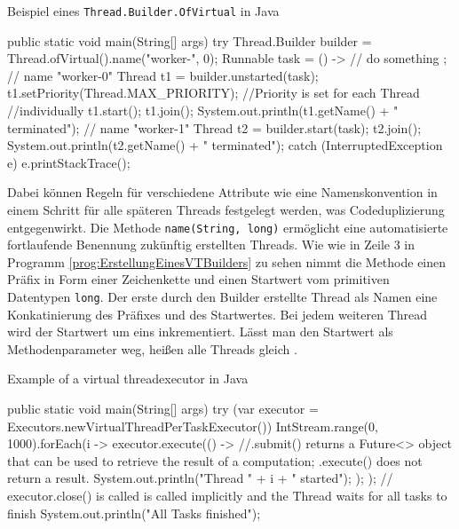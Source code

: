     
    \begin{program} [H]
        \caption{Beispiel eines \texttt{Thread.Builder.OfVirtual} in Java}
        \label{prog:ErstellungEinesVTBuilders}
    \begin{JavaCode}[language=Java, numbers=left]
public static void main(String[] args) {
    try {
        Thread.Builder builder = Thread.ofVirtual().name("worker-", 0);
        Runnable task = () -> {
            // do something
        };
        // name "worker-0"
        Thread t1 = builder.unstarted(task);
        t1.setPriority(Thread.MAX_PRIORITY);    //Priority is set for each Thread 
                                                //individually   
        t1.start(); t1.join();
        System.out.println(t1.getName() + " terminated");
        // name "worker-1"
        Thread t2 = builder.start(task);   
        t2.join();  
        System.out.println(t2.getName() + " terminated");
    } catch (InterruptedException e) {
        e.printStackTrace();
    }
}\end{JavaCode}
    \end{program}

    Dabei können Regeln für verschiedene Attribute wie eine Namenskonvention
    in einem Schritt für alle späteren Threads festgelegt werden, was Codeduplizierung entgegenwirkt.
    Die Methode \texttt{name(String, long)} ermöglicht eine automatisierte fortlaufende Benennung zukünftig erstellten Threads. Wie wie in Zeile 3 in Programm \ref{prog:ErstellungEinesVTBuilders} zu sehen nimmt die Methode einen Präfix in Form einer Zeichenkette und einen Startwert vom primitiven
    Datentypen \texttt{long}. Der erste durch den Builder erstellte Thread als Namen eine Konkatinierung des Präfixes und des Startwertes. Bei jedem weiteren Thread wird der Startwert um eins inkrementiert. Lässt man den Startwert als Methodenparameter weg, heißen alle Threads gleich 
    \cite{oracle22Builder}. 

    \begin{program} [H]
        \caption{Example of a virtual threadexecutor in Java}
        \label{prog:ErstellungEinesExecutors}
    \begin{JavaCode}[language=Java, numbers=left]
public static void main(String[] args) {
    try (var executor = Executors.newVirtualThreadPerTaskExecutor()){
        IntStream.range(0, 1000).forEach(i -> {
            executor.execute(() -> {     //.submit() returns a Future<> object that can be used to retrieve the result of a computation; .execute() does not return a result.
                System.out.println("Thread " + i + " started");
            });
        });
    }       // executor.close() is called is called implicitly and the Thread waits for all tasks to finish
    System.out.println("All Tasks finished"); 
}\end{JavaCode}
    \end{program}

